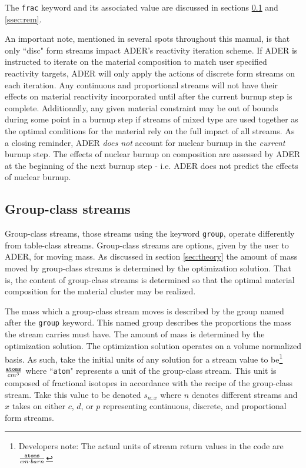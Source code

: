 The \texttt{frac} keyword and its associated value are discussed in sections
\ref{ssec:group} and \ref{ssec:rem}.

An important note, mentioned in several spots throughout this manual, is that
only ``disc" form streams impact ADER's reactivity iteration scheme. If ADER
is instructed to iterate on the material composition to match user specified
reactivity targets, ADER will only apply the actions of discrete form streams
on each iteration. Any continuous and proportional streams will not have
their effects on material reactivity incorporated until after the current burnup
step is complete. Additionally, any given material constraint may be out of
bounds during some point in a burnup step if streams of mixed type are used
together as the optimal conditions for the material rely on the full impact
of all streams. As a closing reminder, ADER \textit{does not} account for
nuclear burnup in the \textit{current} burnup step. The effects of nuclear
burnup on composition are assessed by ADER at the beginning of the next
burnup step - i.e. ADER does not predict the effects of nuclear burnup.

\subsection{Group-class streams}\label{ssec:group}

Group-class streams, those streams using the keyword \texttt{group},
operate differently from table-class streams. Group-class
streams are options, given by the user to ADER, for moving mass. As discussed
in section \ref{sec:theory} the amount of mass moved by group-class streams
is determined by the optimization solution. That is, the content of group-class
streams is determined so that the optimal material composition for the material
cluster may be realized.

The mass which a group-class stream moves is described by the
group named after the \texttt{group} keyword. This named group describes the
proportions the mass the stream carries must have. The amount of mass is
determined by the optimization solution. The optimization solution operates on
a volume normalized basis. As such, take the initial units of any solution for
a stream value to be\footnote{Developers note: The actual units of stream return
 values in the code are $\frac{\text{\texttt{atoms}}}{cm \cdot barn}$}
 $\frac{\text{\texttt{atoms}}}{cm^{3}}$ where
``\texttt{atom}" represents a unit of the group-class stream. This unit
is composed of fractional isotopes in accordance with the recipe of the 
group-class stream. 
Take this value to be denoted $s_{n:x}$ where $n$ denotes different
streams and $x$ takes on either $c$, $d$, or $p$ representing continuous,
discrete, and proportional form streams.

